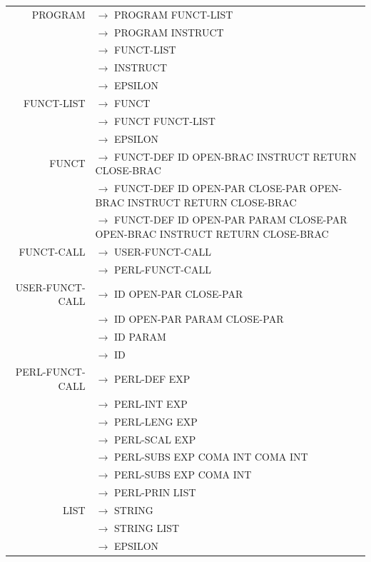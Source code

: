 \documentclass[a4paper,10pt]{article}
\begin{document}
\hspace{-4.5cm}\begin{tabular}{rl}
PROGRAM				& $\rightarrow$ PROGRAM FUNCT-LIST\\
					& $\rightarrow$ PROGRAM INSTRUCT\\
					& $\rightarrow$ FUNCT-LIST\\
					& $\rightarrow$ INSTRUCT\\
					& $\rightarrow$ EPSILON\\
					
					
FUNCT-LIST			& $\rightarrow$ FUNCT \\
					& $\rightarrow$ FUNCT FUNCT-LIST\\
					& $\rightarrow$ EPSILON\\
					
FUNCT				& $\rightarrow$ FUNCT-DEF ID OPEN-BRAC INSTRUCT RETURN CLOSE-BRAC \\
					& $\rightarrow$ FUNCT-DEF ID OPEN-PAR CLOSE-PAR OPEN-BRAC INSTRUCT RETURN CLOSE-BRAC \\
					& $\rightarrow$ FUNCT-DEF ID OPEN-PAR PARAM CLOSE-PAR OPEN-BRAC INSTRUCT RETURN CLOSE-BRAC \\

FUNCT-CALL			& $\rightarrow$ USER-FUNCT-CALL \\
					& $\rightarrow$ PERL-FUNCT-CALL \\

USER-FUNCT-CALL		& $\rightarrow$ ID OPEN-PAR CLOSE-PAR\\ 
					& $\rightarrow$ ID OPEN-PAR PARAM CLOSE-PAR\\ 
					& $\rightarrow$ ID PARAM\\ 
					& $\rightarrow$ ID\\ 

				
PERL-FUNCT-CALL		& $\rightarrow$ PERL-DEF EXP \\
					& $\rightarrow$ PERL-INT EXP \\
					& $\rightarrow$ PERL-LENG EXP \\ 
					& $\rightarrow$ PERL-SCAL EXP \\
					& $\rightarrow$ PERL-SUBS EXP COMA INT COMA INT \\
					& $\rightarrow$ PERL-SUBS EXP COMA INT  \\
					& $\rightarrow$ PERL-PRIN LIST \\ 
					
LIST				& $\rightarrow$ STRING \\
					& $\rightarrow$ STRING LIST\\
					& $\rightarrow$ EPSILON\\
				


\end{tabular}
\end{document}
